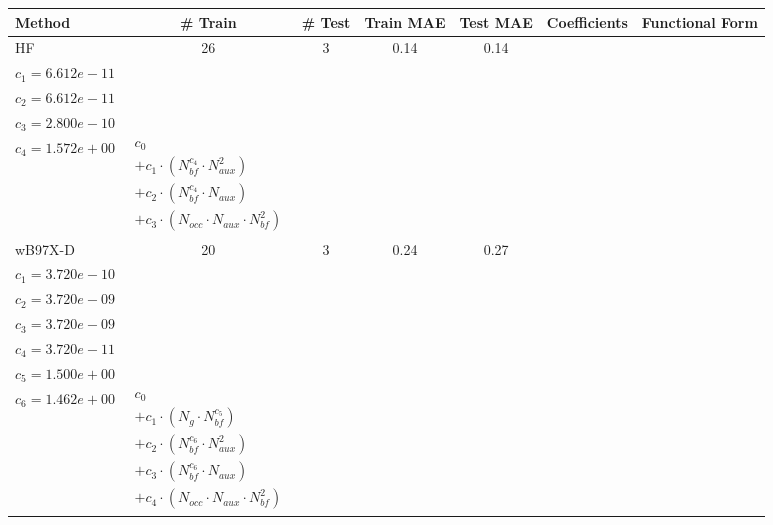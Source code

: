 \small
\setlength{\tabcolsep}{3pt}
\begin{longtable}{|l|c|c|c|c|p{3.2cm}|p{5.0cm}|}
\hline
\textbf{Method} & \textbf{\# Train} & \textbf{\# Test} & \textbf{Train MAE} & \textbf{Test MAE} & \textbf{Coefficients} & \textbf{Functional Form} \\ 
\hline
\endhead
HF & 26 & 3 & 0.14 & 0.14 & \begin{tabular}{l}\(c_{0}=1.000e+00\) \\ \(c_{1}=6.612e-11\) \\ \(c_{2}=6.612e-11\) \\ \(c_{3}=2.800e-10\) \\ \(c_{4}=1.572e+00\)\end{tabular} & $\begin{array}{l}c_{0} \\ + c_{1}  \cdot  (N_{bf} ^{c_{4}}  \cdot  N_{aux} ^{2}) \\ + c_{2}  \cdot  (N_{bf} ^{c_{4}}  \cdot  N_{aux}) \\ + c_{3}  \cdot  (N_{occ}  \cdot  N_{aux}  \cdot  N_{bf} ^{2})\end{array}$ \\ 
\hline
wB97X-D & 20 & 3 & 0.24 & 0.27 & \begin{tabular}{l}\(c_{0}=1.828e-04\) \\ \(c_{1}=3.720e-10\) \\ \(c_{2}=3.720e-09\) \\ \(c_{3}=3.720e-09\) \\ \(c_{4}=3.720e-11\) \\ \(c_{5}=1.500e+00\) \\ \(c_{6}=1.462e+00\)\end{tabular} & $\begin{array}{l}c_{0} \\ + c_{1}  \cdot  (N_{g}  \cdot  N_{bf} ^{c_{5}}) \\ + c_{2}  \cdot  (N_{bf} ^{c_{6}}  \cdot  N_{aux}^{2}) \\ + c_{3}  \cdot  (N_{bf} ^{c_{6}}  \cdot  N_{aux}) \\ + c_{4}  \cdot  (N_{occ}  \cdot  N_{aux}  \cdot  N_{bf} ^{2})\end{array}$ \\ 
\hline

\end{longtable}
